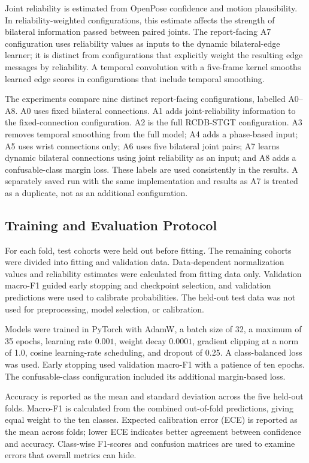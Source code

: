 Joint reliability is estimated from OpenPose confidence and motion plausibility. In reliability-weighted configurations, this estimate affects the strength of bilateral information passed between paired joints. The report-facing A7 configuration uses reliability values as inputs to the dynamic bilateral-edge learner; it is distinct from configurations that explicitly weight the resulting edge messages by reliability. A temporal convolution with a five-frame kernel smooths learned edge scores in configurations that include temporal smoothing.

The experiments compare nine distinct report-facing configurations, labelled A0--A8. A0 uses fixed bilateral connections. A1 adds joint-reliability information to the fixed-connection configuration. A2 is the full RCDB-STGT configuration. A3 removes temporal smoothing from the full model; A4 adds a phase-based input; A5 uses wrist connections only; A6 uses five bilateral joint pairs; A7 learns dynamic bilateral connections using joint reliability as an input; and A8 adds a confusable-class margin loss. These labels are used consistently in the results. A separately saved run with the same implementation and results as A7 is treated as a duplicate, not as an additional configuration.

\subsection{Training and Evaluation Protocol}

For each fold, test cohorts were held out before fitting. The remaining cohorts were divided into fitting and validation data. Data-dependent normalization values and reliability estimates were calculated from fitting data only. Validation macro-F1 guided early stopping and checkpoint selection, and validation predictions were used to calibrate probabilities. The held-out test data was not used for preprocessing, model selection, or calibration.

Models were trained in PyTorch with AdamW, a batch size of 32, a maximum of 35 epochs, learning rate $0.001$, weight decay $0.0001$, gradient clipping at a norm of 1.0, cosine learning-rate scheduling, and dropout of 0.25. A class-balanced loss was used. Early stopping used validation macro-F1 with a patience of ten epochs. The confusable-class configuration included its additional margin-based loss.

Accuracy is reported as the mean and standard deviation across the five held-out folds. Macro-F1 is calculated from the combined out-of-fold predictions, giving equal weight to the ten classes. Expected calibration error (ECE) is reported as the mean across folds; lower ECE indicates better agreement between confidence and accuracy. Class-wise F1-scores and confusion matrices are used to examine errors that overall metrics can hide.

